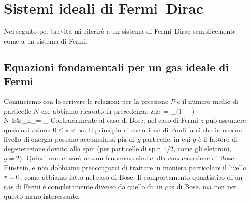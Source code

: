 \chapter{Sistemi ideali di Fermi--Dirac}
\label{cap:fermi}

Nel seguito per brevità mi riferirò a un sistema di Fermi--Dirac semplicemente
come a un sistema di Fermi.

\section{Equazioni fondamentali per un gas ideale di Fermi}

Cominciamo con lo scrivere le relazioni per la pressione $P$ e il numero medio
di particelle $N$ che abbiamo ricavato in precedenza:
\bea
\label{eq:fermifund}
 &\equiv& \ln\calQ = \sum_\eps\ln\left(1 + \zembe\right)
\nonumber\\
N &\equiv&\sum_\eps \langle n_\eps\rangle = \sum_\eps {}
\eea
Contrariamente al caso di Bose, nel caso di Fermi $z$ può assumere qualsiasi
valore: $0 \le z < \infty$. Il principio di esclusione di Pauli fa sì che in
nessun livello di energia possano accumularsi più di $g$ particelle, in cui $g$
è il fattore di degenerazione dovuto allo spin (per particelle di spin $1/2$,
come gli elettroni, $g = 2$). Quindi non ci sarà nessun fenomeno simile alla
condensazione di Bose--Einstein, e non dobbiamo preoccuparci di trattare in
maniera particolare il livello $\varepsilon =0$, come abbiamo fatto nel caso di Bose.
Il comportamento quantistico di un gas di Fermi è completamente diverso da
quello di un gas di Bose, ma non per questo meno interessante.

